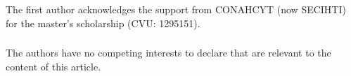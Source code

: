 \documentclass[runningheads]{llncs}
\begin{document}
\begin{credits}
\subsubsection{\ackname}
The first author acknowledges the support from CONAHCYT (now
SECIHTI) for the master's scholarship (CVU: 1295151).

\subsubsection{\discintname}
The authors have no competing interests to declare that are relevant
to the content of this article.
\end{credits}
%
%
%


\end{document}

